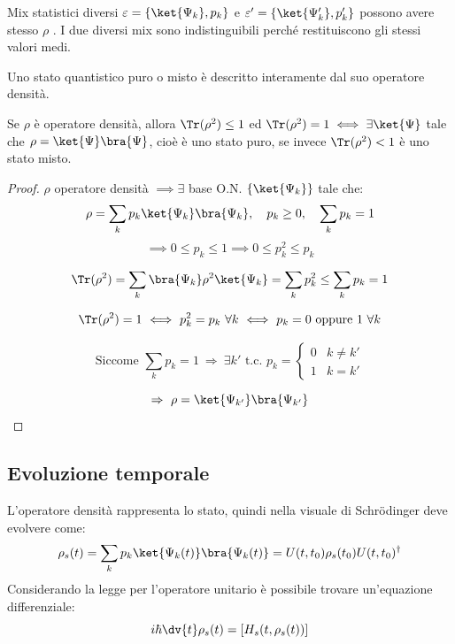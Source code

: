 \begin{remark}
    Mix statistici diversi \( \varepsilon = \left\{ \ket{\Psi_k}, p_k  \right\}\) e \( \varepsilon' = \left\{ \ket{\Psi'_k}, p'_k  \right\}\) possono avere stesso \(\rho\) .
    I due diversi mix sono indistinguibili perché restituiscono gli stessi valori medi.
\end{remark}
Uno stato quantistico puro o misto è descritto interamente dal suo operatore densità.

\begin{theorem}
    Se \(\rho\) è operatore densità, allora \(\Tr (\rho^2)\leq 1\) ed \(\Tr(\rho^2)= 1 \iff \exists \ket{\Psi} \) tale che \(\rho = \ket{\Psi}\bra{\Psi}\), cioè è uno stato puro, se invece \(\Tr(\rho^2)< 1\) è uno stato misto.
\end{theorem}
\begin{proof}
    \(\rho\) operatore densità \(\implies \exists\) base O.N. \(\left\{ \ket{\Psi_k} \right\}\) tale che:
    \[
    \rho = \sum_k p_k \ket{\Psi_k}\bra{\Psi_k}, 
    \quad p_k \ge 0, 
    \quad \sum_k p_k = 1
    \]
    \[
     \implies 0 \le p_k \le 1 
   \implies
    0 \le p_k^2 \le p_k
    \]

    \[
    \Tr(\rho^2)
    = \sum_k \bra{\Psi_k} \rho^2 \ket{\Psi_k}
    = \sum_k p_k^2 
    \le \sum_k p_k = 1
    \]

    \[
    \Tr(\rho^2) = 1 
    \ \Longleftrightarrow\ 
    p_k^2 = p_k \ \forall k 
    \ \Longleftrightarrow\ 
    p_k = 0 \text{ oppure } 1 \ \forall k
    \]

    \[
    \text{Siccome } \sum_k p_k = 1 
    \ \Rightarrow\ 
    \exists k' \text{ t.c. } 
    p_k = 
    \begin{cases}
    0 & k \neq k' \\
    1 & k = k'
    \end{cases}
    \]

    \[
    \Rightarrow\ 
    \rho = \ket{\Psi_{k'}}\bra{\Psi_{k'}}
    \]

\end{proof}


\subsection{Evoluzione temporale}
L'operatore densità rappresenta lo stato, quindi nella visuale di Schrödinger deve evolvere come:
\begin{equation}
    \rho_s(t)= \sum_k p_k \ket{\Psi_k(t)}\bra{\Psi_k(t)}= U(t,t_0)\rho_s(t_0)U (t, t_0)^\dagger
\end{equation}
Considerando la legge per l'operatore unitario è possibile trovare un'equazione differenziale:
\begin{equation}
    i\hbar \dv{t}\rho_s(t) = \left[ H_s(t, \rho_s(t)) \right]
\end{equation}

